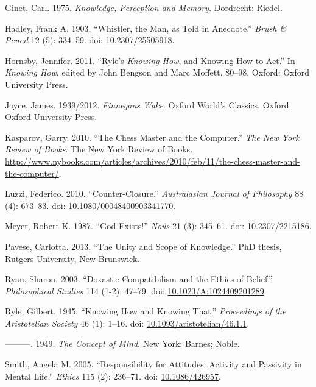 \documentclass[
  11pt,
  letterpaper,
  DIV=11,
  numbers=noendperiod,
  twoside]{scrartcl}
\newlength{\cslhangindent}
\newenvironment{CSLReferences}[2] %
 {\begin{list}{}{%
  \setlength{\itemindent}{0pt}
  \setlength{\leftmargin}{0pt}
  \setlength{\parsep}{0pt}
  \ifodd #1
   \setlength{\leftmargin}{\cslhangindent}
   \setlength{\itemindent}{-1\cslhangindent}
  \fi
  \setlength{\itemsep}{#2\baselineskip}}}
 {\end{list}}
\begin{document}
\begin{CSLReferences}{1}{0}
Ginet, Carl. 1975. \emph{Knowledge, Perception and Memory}. Dordrecht:
Riedel.

Hadley, Frank A. 1903. {``Whistler, the Man, as Told in Anecdote.''}
\emph{Brush \& Pencil} 12 (5): 334--59. doi:
\href{https://doi.org/10.2307/25505918}{10.2307/25505918}.

Hornsby, Jennifer. 2011. {``Ryle's \emph{Knowing How}, and Knowing How
to Act.''} In \emph{Knowing How}, edited by John Bengson and Marc
Moffett, 80--98. Oxford: Oxford University Press.

Joyce, James. 1939/2012. \emph{Finnegans Wake}. Oxford World's Classics.
Oxford: Oxford University Press.

Kasparov, Garry. 2010. {``The Chess Master and the Computer.''}
\emph{The New York Review of Books}. The New York Review of Books.
\url{http://www.nybooks.com/articles/archives/2010/feb/11/the-chess-master-and-the-computer/}.

Luzzi, Federico. 2010. {``Counter-Closure.''} \emph{Australasian Journal
of Philosophy} 88 (4): 673--83. doi:
\href{https://doi.org/10.1080/00048400903341770}{10.1080/00048400903341770}.

Meyer, Robert K. 1987. {``God Exists!''} \emph{No{û}s} 21 (3): 345--61.
doi: \href{https://doi.org/10.2307/2215186}{10.2307/2215186}.

Pavese, Carlotta. 2013. {``The Unity and Scope of Knowledge.''} PhD
thesis, Rutgers University, New Brunswick.

Ryan, Sharon. 2003. {``Doxastic Compatibilism and the Ethics of
Belief.''} \emph{Philosophical Studies} 114 (1-2): 47--79. doi:
\href{https://doi.org/10.1023/A:1024409201289}{10.1023/A:1024409201289}.

Ryle, Gilbert. 1945. {``Knowing How and Knowing That.''}
\emph{Proceedings of the Aristotelian Society} 46 (1): 1--16. doi:
\href{https://doi.org/10.1093/aristotelian/46.1.1}{10.1093/aristotelian/46.1.1}.

---------. 1949. \emph{The Concept of Mind}. New York: Barnes; Noble.

Smith, Angela M. 2005. {``Responsibility for Attitudes: Activity and
Passivity in Mental Life.''} \emph{Ethics} 115 (2): 236--71. doi:
\href{https://doi.org/10.1086/426957}{10.1086/426957}.


\end{CSLReferences}
\end{document}
